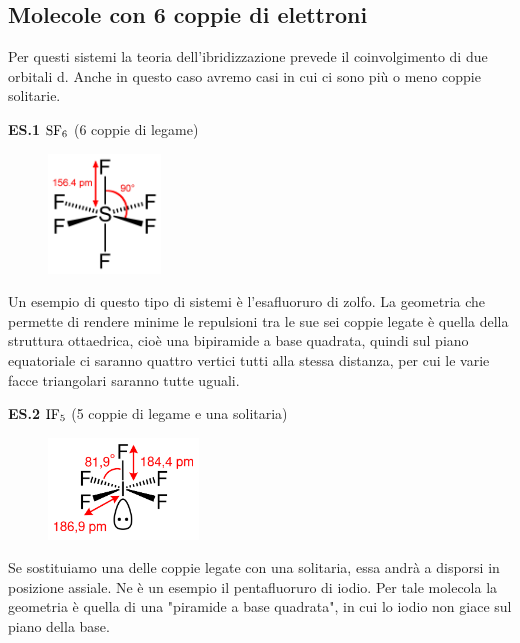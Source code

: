 \subsection{Molecole con 6 coppie di elettroni}
Per questi sistemi la teoria dell'ibridizzazione prevede il coinvolgimento di due orbitali d. Anche in questo caso avremo casi in cui ci sono più o meno coppie solitarie.

\vspace{0.2cm}\textbf{ES.1} $\rm SF_6$ (6 coppie di legame)

\hspace{1cm}\begin{minipage}{0.2\textwidth}
    \begin{figure}[H]
    \includegraphics[width=3cm]{immagini/SF_6.png}
    \end{figure}
    \end{minipage} \hfill
    \begin{minipage}{0.65\textwidth}
        \vspace{0.2cm}Un esempio di questo tipo di sistemi è l'esafluoruro di zolfo. La geometria che permette di rendere minime le repulsioni tra le sue sei coppie legate è quella della struttura ottaedrica, cioè una bipiramide a base quadrata, quindi sul piano equatoriale ci saranno quattro vertici tutti alla stessa distanza, per cui le varie facce triangolari saranno tutte uguali.
    \end{minipage}

\vspace{0.2cm}\textbf{ES.2} $\rm IF_5$ (5 coppie di legame e una solitaria)

\hspace{0.5cm}\begin{minipage}{0.2\textwidth}
    \begin{figure}[H]
    \includegraphics[width=4cm]{immagini/IF_5.png}
    \end{figure}
    \end{minipage} \hfill
    \begin{minipage}{0.65\textwidth}
        \vspace{0.2cm}Se sostituiamo una delle coppie legate con una solitaria, essa andrà a disporsi in posizione assiale. Ne è un esempio il pentafluoruro di iodio. Per tale molecola la geometria è quella di una "piramide a base quadrata", in cui lo iodio non giace sul piano della base.
    \end{minipage}

